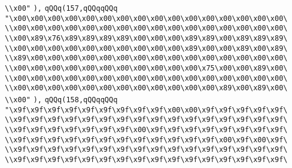 \verb|\\x00"|\newline
\verb|),|\newline
\verb|qQQq(157,qQQqqQQq|\newline
\verb|"\x00\x00\x00\x00\x00\x00\x00\x00\x00\x00\x00\x00\x00\x00\x00\x00\|\newline
\verb|\\x00\x00\x00\x00\x00\x00\x00\x00\x00\x00\x00\x00\x00\x00\x00\x00\|\newline
\verb|\\x00\x89\x76\x89\x89\x89\x89\x00\x00\x00\x89\x89\x00\x89\x89\x89\|\newline
\verb|\\x00\x00\x00\x00\x00\x00\x00\x00\x00\x00\x89\x00\x00\x89\x00\x89\|\newline
\verb|\\x89\x00\x00\x00\x00\x00\x00\x00\x00\x00\x00\x00\x00\x00\x00\x00\|\newline
\verb|\\x00\x00\x00\x00\x00\x00\x00\x00\x00\x00\x00\x75\x00\x00\x89\x00\|\newline
\verb|\\x00\x00\x00\x00\x00\x00\x00\x00\x00\x00\x00\x00\x00\x00\x00\x00\|\newline
\verb|\\x00\x00\x00\x00\x00\x00\x00\x00\x00\x00\x00\x00\x89\x00\x89\x00\|\newline
\verb|\\x00"|\newline
\verb|),|\newline
\verb|qQQq(158,qQQqqQQq|\newline
\verb|"\x9f\x9f\x9f\x9f\x9f\x9f\x9f\x9f\x9f\x00\x00\x9f\x9f\x9f\x9f\x9f\|\newline
\verb|\\x9f\x9f\x9f\x9f\x9f\x9f\x9f\x9f\x9f\x9f\x9f\x9f\x9f\x9f\x9f\x9f\|\newline
\verb|\\x9f\x9f\x9f\x9f\x9f\x9f\x9f\x00\x9f\x9f\x9f\x9f\x9f\x9f\x9f\x9f\|\newline
\verb|\\x9f\x9f\x9f\x9f\x9f\x9f\x9f\x9f\x9f\x9f\x9f\x9f\x00\x9f\x00\x9f\|\newline
\verb|\\x9f\x9f\x9f\x9f\x9f\x9f\x9f\x9f\x9f\x9f\x9f\x9f\x9f\x9f\x9f\x9f\|\newline
\verb|\\x9f\x9f\x9f\x9f\x9f\x9f\x9f\x9f\x9f\x9f\x9f\x9f\x9f\x9f\x9f\x9f\|\newline
